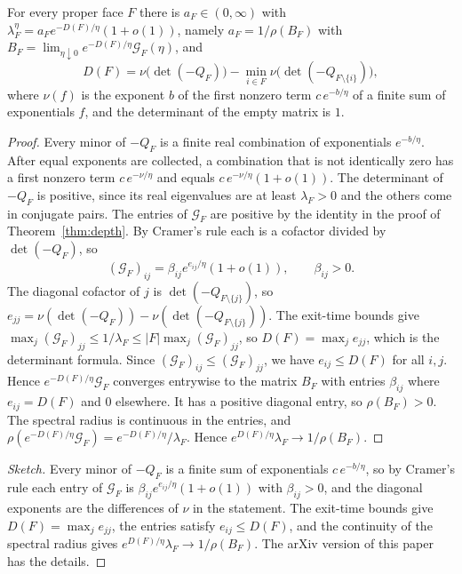\begin{proposition}[prefactors]\label{prop:prefactor}
For every proper face $F$ there is $a_F\in(0,\infty)$ with
$\lambda^\eta_F=a_Fe^{-D(F)/\eta}(1+o(1))$, namely $a_F=1/\rho(B_F)$ with
$B_F=\lim_{\eta\downarrow0}e^{-D(F)/\eta}\mathcal G_F(\eta)$, and
\[
 D(F)=\nu\bigl(\det(-Q_F)\bigr)-\min_{i\in F}\nu\bigl(\det(-Q_{F\setminus\{i\}})\bigr),
\]
where $\nu(f)$ is the exponent $b$ of the first nonzero term $c\,e^{-b/\eta}$
of a finite sum of exponentials $f$, and the determinant of the empty matrix
is $1$.
\end{proposition}

\ifarxivbuild
\begin{proof}
Every minor of $-Q_F$ is a finite real combination of exponentials
$e^{-b/\eta}$. After equal exponents are collected, a combination that is not
identically zero has a first nonzero term $c\,e^{-\nu/\eta}$ and equals
$c\,e^{-\nu/\eta}(1+o(1))$. The determinant of $-Q_F$ is positive, since its
real eigenvalues are at least $\lambda_F>0$ and the others come in conjugate
pairs. The entries of $\mathcal G_F$ are positive by the identity in the proof
of Theorem~\ref{thm:depth}. By Cramer's rule each is a cofactor divided by
$\det(-Q_F)$, so
\[
 (\mathcal G_F)_{ij}=\beta_{ij}e^{e_{ij}/\eta}(1+o(1)),\qquad \beta_{ij}>0 .
\]
The diagonal cofactor of $j$ is $\det(-Q_{F\setminus\{j\}})$, so
$e_{jj}=\nu(\det(-Q_F))-\nu(\det(-Q_{F\setminus\{j\}}))$. The exit-time
bounds give $\max_j(\mathcal G_F)_{jj}\le1/\lambda_F\le|F|\max_j(\mathcal G_F)_{jj}$,
so $D(F)=\max_je_{jj}$, which is the determinant formula. Since
$(\mathcal G_F)_{ij}\le(\mathcal G_F)_{jj}$, we have $e_{ij}\le D(F)$ for all
$i,j$. Hence $e^{-D(F)/\eta}\mathcal G_F$ converges entrywise to the matrix
$B_F$ with entries $\beta_{ij}$ where $e_{ij}=D(F)$ and $0$ elsewhere. It has a
positive diagonal entry, so $\rho(B_F)>0$. The spectral radius is continuous
in the entries, and $\rho(e^{-D(F)/\eta}\mathcal G_F)=e^{-D(F)/\eta}/\lambda_F$.
Hence $e^{D(F)/\eta}\lambda_F\to1/\rho(B_F)$.
\end{proof}
\else
\begin{proof}[Sketch]
Every minor of $-Q_F$ is a finite sum of exponentials $c\,e^{-b/\eta}$, so by Cramer's rule each
entry of $\mathcal G_F$ is $\beta_{ij}e^{e_{ij}/\eta}(1+o(1))$ with $\beta_{ij}>0$, and the diagonal
exponents are the differences of $\nu$ in the statement. The exit-time bounds give
$D(F)=\max_je_{jj}$, the entries satisfy $e_{ij}\le D(F)$, and the continuity of the spectral
radius gives $e^{D(F)/\eta}\lambda_F\to1/\rho(B_F)$. The arXiv version of this paper has the
details.
\end{proof}
\fi

